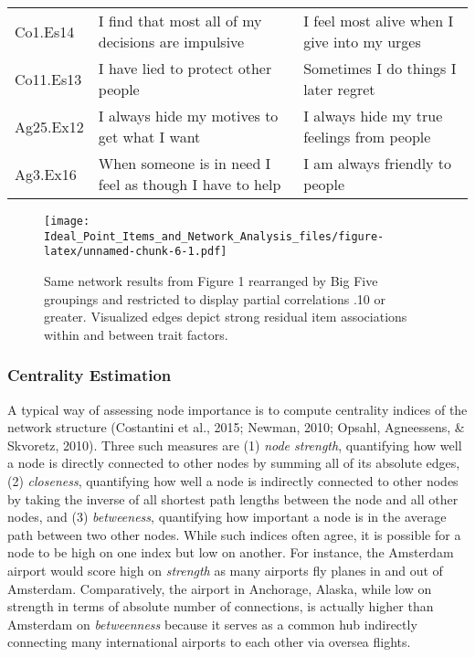\documentclass[english,man]{apa6}
\theoremstyle{definition}
\theoremstyle{definition}
\theoremstyle{remark}
\begin{document}
\begin{table}[!h]
{\begin{tabular}[t]{lll}
Co1.Es14 & I find that most all of my decisions are impulsive & I feel most alive when I give into my urges\\
\addlinespace
Co11.Es13 & I have lied to protect other people & Sometimes I do things I later regret\\
Ag25.Ex12 & I always hide my motives to get what I want & I always hide my true feelings from people\\
Ag3.Ex16 & When someone is in need I feel as though I have to help & I am always friendly to people\\
\bottomrule
\end{tabular}}
\end{table}

\begin{figure}[htbp]
\centering
\texttt{[image: Ideal\_Point\_Items\_and\_Network\_Analysis\_files/figure-latex/unnamed-chunk-6-1.pdf]}
\caption{\label{fig:unnamed-chunk-6}Same network results from Figure 1
rearranged by Big Five groupings and restricted to display partial
correlations .10 or greater. Visualized edges depict strong residual
item associations within and between trait factors.}
\end{figure}

\subsubsection{Centrality Estimation}\label{centrality-estimation}

A typical way of assessing node importance is to compute centrality
indices of the network structure (Costantini et al., 2015; Newman, 2010;
Opsahl, Agneessens, \& Skvoretz, 2010). Three such measures are (1)
\emph{node strength}, quantifying how well a node is directly connected
to other nodes by summing all of its absolute edges, (2)
\emph{closeness}, quantifying how well a node is indirectly connected to
other nodes by taking the inverse of all shortest path lengths between
the node and all other nodes, and (3) \emph{betweeness}, quantifying how
important a node is in the average path between two other nodes. While
such indices often agree, it is possible for a node to be high on one
index but low on another. For instance, the Amsterdam airport would
score high on \emph{strength} as many airports fly planes in and out of
Amsterdam. Comparatively, the airport in Anchorage, Alaska, while low on
strength in terms of absolute number of connections, is actually higher
than Amsterdam on \emph{betweenness} because it serves as a common hub
indirectly connecting many international airports to each other via
oversea flights.
\end{document}
